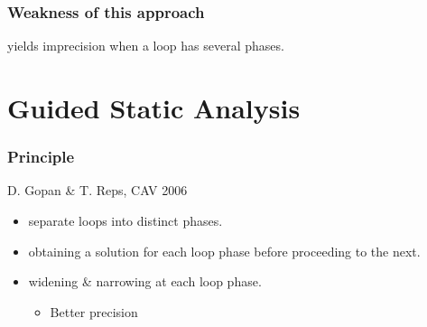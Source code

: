 \documentclass{beamer}
\begin{document}
\begin{frame}
\begin{columns}
\begin{column}{5cm}
\end{column}
\end{columns}
\end{frame}

\begin{frame}
  \frametitle{Weakness of this approach}
	\begin{center}
		yields imprecision when a loop has several phases.
	\end{center}
\end{frame}

\section[Guided Static Analysis]{Guided Static Analysis}

\begin{frame}
  \frametitle{Principle}

D. Gopan \& T. Reps, CAV 2006
\bigskip
\begin{itemize}
\item separate loops into distinct phases.
\item obtaining a solution for each loop phase before proceeding to the next.
\item widening \& narrowing at each loop phase.
\begin{itemize}
\item Better precision
\end{itemize}
\end{itemize}
\end{frame}
\end{document}
